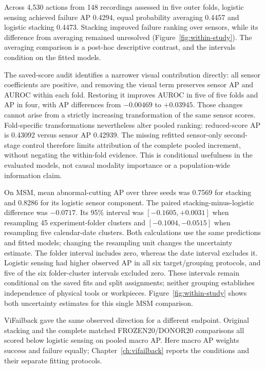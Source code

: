 Across 4,530 actions from 148 recordings assessed in five outer folds, logistic sensing
achieved failure AP 0.4294, equal probability averaging 0.4457 and logistic stacking
0.4473. Stacking improved failure ranking over sensors, while its difference from
averaging remained unresolved (Figure~\ref{fig:within-study}). The averaging comparison
is a post-hoc descriptive contrast, and the intervals condition on the fitted
models.

The saved-score audit identifies a narrower visual contribution directly: all sensor
coefficients are positive, and removing the visual term preserves sensor AP and AUROC
within each fold. Restoring it improves AUROC in five of five folds and AP in four, with
AP differences from $-0.00469$ to $+0.03945$. Those changes cannot arise from a strictly
increasing transformation of the same sensor scores. Fold-specific transformations
nevertheless alter pooled ranking: reduced-score AP is 0.43092 versus sensor AP 0.42939.
The missing refitted sensor-only second-stage control therefore limits attribution of
the complete pooled increment, without negating the within-fold evidence. This is
conditional usefulness in the evaluated models, not causal modality importance or a
population-wide information claim.

On MSM, mean abnormal-cutting AP over three seeds was 0.7569 for stacking and 0.8286 for
its logistic sensor component. The paired stacking-minus-logistic difference was
$-0.0717$. Its 95\% interval was $[-0.1605, +0.0031]$ when resampling 45 experiment-folder
clusters and $[-0.1004, -0.0515]$ when resampling five calendar-date clusters. Both
calculations use the same predictions and fitted models; changing the resampling unit
changes the uncertainty estimate. The folder interval includes zero, whereas the date
interval excludes it. Logistic sensing had higher observed AP in all six target/grouping
protocols, and five of the six folder-cluster intervals excluded zero. These intervals
remain conditional on the saved fits and split assignments; neither grouping establishes
independence of physical tools or workpieces. Figure~\ref{fig:within-study} shows both
uncertainty estimates for this single MSM comparison.

ViFailback gave the same observed direction for a different endpoint. Original stacking
and the complete matched FROZEN20/DONOR20 comparisons all scored below logistic sensing
on pooled macro AP. Here macro AP weights success and failure equally;
Chapter~\ref{ch:vifailback} reports the conditions and their separate fitting
protocols.

